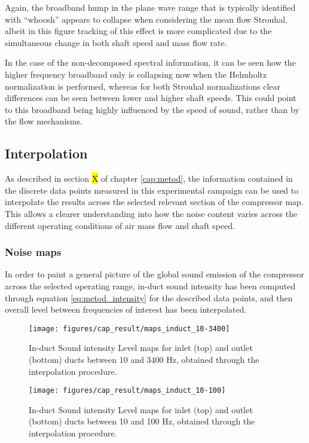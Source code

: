 Again, the broadband hump in the plane wave range that is typically identified with ``whoosh'' appears to collapse when considering the mean flow Strouhal, albeit in this figure tracking of this effect is more complicated due to the simultaneous change in both shaft speed and mass flow rate. 

In the case of the non-decomposed spectral information, it can be seen how the higher frequency broadband only is collapsing now when the Helmholtz normalization is performed, whereas for both Strouhal normalizations clear differences can be seen between lower and higher shaft speeds. This could point to this broadband being highly influenced by the speed of sound, rather than by the flow mechanisms.

\subsection{Interpolation}

As described in section \hl{X} of chapter \ref{cap:metod}, the information contained in the discrete data points measured in this experimental campaign can be used to interpolate the results across the selected relevant section of the compressor map. This allows a clearer understanding into how the noise content varies across the different operating conditions of air mass flow and shaft speed.

\subsubsection{Noise maps}

In order to paint a general picture of the global sound emission of the compressor across the selected operating range, in-duct sound intensity has been computed through equation \ref{eq:metod_intensity} for the described data points, and then overall level between frequencies of interest has been interpolated. 

\begin{figure}[tbh!]
\centering
\texttt{[image: figures/cap\_result/maps\_induct\_10-3400]}
\vspace{-2.25cm}
\caption{In-duct Sound intensity Level maps for inlet (top) and outlet (bottom) ducts between 10 and 3400 Hz, obtained through the interpolation procedure.}
\label{fig:maps_induct_10-3400}
\end{figure}

\begin{figure}[tbh!]
\centering
\texttt{[image: figures/cap\_result/maps\_induct\_10-100]}
\vspace{-2.25cm}
\caption{In-duct Sound intensity Level maps for inlet (top) and outlet (bottom) ducts between 10 and 100 Hz, obtained through the interpolation procedure.}
\label{fig:maps_induct_10-100}
\end{figure}


